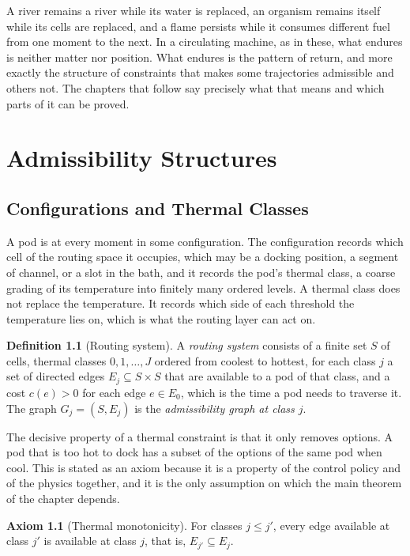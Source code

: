 \documentclass[11pt,openany]{book}
\theoremstyle{plain}
\theoremstyle{definition}
\newtheorem{definition}[theorem]{Definition}
\newtheorem{axiom}[theorem]{Axiom}
\theoremstyle{remark}
\begin{document}
A river remains a river while its water is replaced, an organism remains itself while its cells are replaced, and a flame persists while it consumes different fuel from one moment to the next. In a circulating machine, as in these, what endures is neither matter nor position. What endures is the pattern of return, and more exactly the structure of constraints that makes some trajectories admissible and others not. The chapters that follow say precisely what that means and which parts of it can be proved.

\chapter{Admissibility Structures}
\label{ch:structures}

\section{Configurations and Thermal Classes}

A pod is at every moment in some configuration. The configuration records which cell of the routing space it occupies, which may be a docking position, a segment of channel, or a slot in the bath, and it records the pod's thermal class, a coarse grading of its temperature into finitely many ordered levels. A thermal class does not replace the temperature. It records which side of each threshold the temperature lies on, which is what the routing layer can act on.

\begin{definition}[Routing system]
\label{def:routing}
A \emph{routing system} consists of a finite set $S$ of cells, thermal classes $0,1,\dots,J$ ordered from coolest to hottest, for each class $j$ a set of directed edges $E_j\subseteq S\times S$ that are available to a pod of that class, and a cost $c(e)>0$ for each edge $e\in E_0$, which is the time a pod needs to traverse it. The graph $G_j=(S,E_j)$ is the \emph{admissibility graph at class $j$}.
\end{definition}

The decisive property of a thermal constraint is that it only removes options. A pod that is too hot to dock has a subset of the options of the same pod when cool. This is stated as an axiom because it is a property of the control policy and of the physics together, and it is the only assumption on which the main theorem of the chapter depends.

\begin{axiom}[Thermal monotonicity]
\label{ax:monotone}
For classes $j\le j'$, every edge available at class $j'$ is available at class $j$, that is, $E_{j'}\subseteq E_j$.
\end{axiom}
\end{document}
